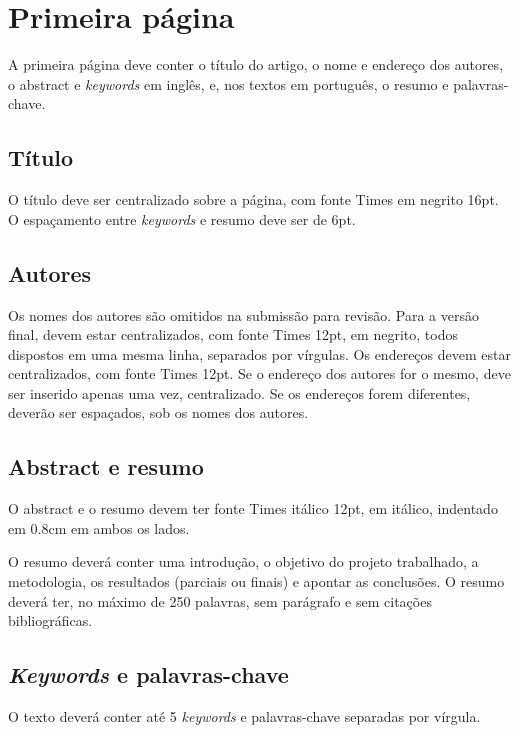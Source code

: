 \documentclass[12pt]{article}
\begin{document}
\section{Primeira página}

A primeira página deve conter o título do artigo, o nome e endereço
dos autores, o abstract e \textit{keywords} em inglês, e, nos textos
em português, o resumo e palavras-chave.

\subsection{Título}
\label{sec:titulo}

O título deve ser centralizado sobre a página, com fonte
Times em negrito 16pt. O espaçamento entre \textit{keywords} e resumo
deve ser de 6pt.

\subsection{Autores}
\label{sec:autores}

Os nomes dos autores são omitidos na submissão para revisão. Para a
versão final, devem estar centralizados, com fonte Times 12pt, em
negrito, todos dispostos em uma mesma linha, separados por vírgulas.
Os endereços devem estar centralizados, com fonte Times 12pt. Se o
endereço dos autores for o mesmo, deve ser inserido apenas uma vez,
centralizado. Se os endereços forem diferentes, deverão ser espaçados,
sob os nomes dos autores.

\subsection{Abstract e resumo}
\label{sec:abstract-e-resumo}

O abstract e o resumo devem ter fonte Times itálico 12pt, em itálico,
indentado em 0.8cm em ambos os lados.

O resumo deverá conter uma introdução, o objetivo do projeto
trabalhado, a metodologia, os resultados (parciais ou finais) e
apontar as conclusões. O resumo deverá ter, no máximo de 250 palavras,
sem parágrafo e sem citações bibliográficas.

\subsection{\textit{Keywords} e palavras-chave}
\label{sec:keywords-e-palavras}

O texto deverá conter até 5 \textit{keywords} e palavras-chave
separadas por vírgula.
\end{document}
